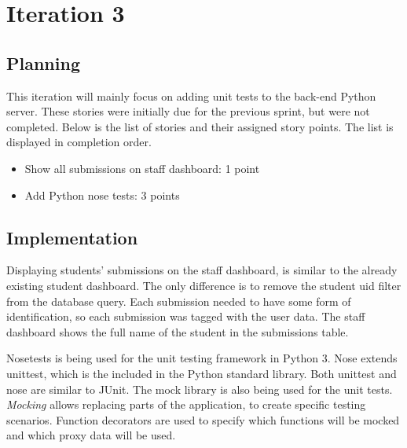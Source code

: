 \chapter{Iteration 3}
\section{Planning}
This iteration will mainly focus on adding unit tests to the back-end Python server. These stories were initially due for the previous sprint, but were not completed. Below is the list of stories and their assigned story points. The list is displayed in completion order.

\begin{itemize}
\item Show all submissions on staff dashboard: 1 point
\item Add Python nose tests: 3 points
\end{itemize}

\section{Implementation}
Displaying students' submissions on the staff dashboard, is similar to the already existing student dashboard. The only difference is to remove the student uid filter from the database query. Each submission needed to have some form of identification, so each submission was tagged with the user data. The staff dashboard shows the full name of the student in the submissions table.

Nosetests is being used for the unit testing framework in Python 3. Nose extends unittest, which is the included in the Python standard library. Both unittest and nose are similar to JUnit. The mock library is also being used for the unit tests. \textit{Mocking} allows replacing parts of the application, to create specific testing scenarios. Function decorators are used to specify which functions will be mocked and which proxy data will be used.

